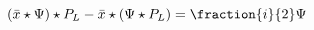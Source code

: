 \begin{equation}(\bar{x}\star\Psi)\star P_L-\bar{x}\star(\Psi\star
P_L)=\fraction{i}{2}\Psi \label{eq:anomaly}
\end{equation} 
